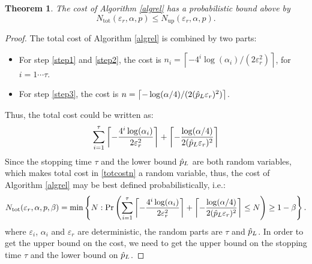 \documentclass{iitthesis}
\newtheorem{theorem}{Theorem}[section]
\theoremstyle{definition}
\begin{document}
\begin{theorem} \label{costupperboundrel}
The cost of Algorithm \ref{algrel} has a probabilistic bound above by $$N_{\text{tot}}(\varepsilon_r,\alpha,p) \leq N_{\text{up}}(\varepsilon_r,\alpha,p).$$
\end{theorem}
\begin{proof}
The total cost of Algorithm \ref{algrel} is combined by two parts:
\begin{itemize}
\item For step \ref{step1} and \ref{step2}, the cost is $n_i = \left \lceil -4^i \log\left ( \alpha_i \right)/(2\varepsilon_r^2) \right \rceil$, for $i = 1 \cdots \tau$.
\item For step \ref{step3}, the cost is $n= \left \lceil -\log (\alpha/4)/(2  (\hat{p}_L \varepsilon_{r})^2)\right \rceil $. 
\end{itemize}
Thus, the total cost could be written as: 
\begin{align}\label{totcostn}
\sum_{i=1}^{\tau} \left \lceil -\frac{4^i \log(\alpha_i)} {2\varepsilon_r^2 } \right\rceil+\left \lceil -\frac{\log (\alpha/4)}{2  (\hat{p}_L \varepsilon_{r})^2} \right \rceil
\end{align}
Since the stopping time $\tau$ and the lower bound $\hat{p}_L$ are both random variables, which makes total cost in \eqref{totcostn} a random variable, thus, the cost of Algorithm \ref{algrel} may be best defined probabilistically, i.e.:
$$N_{\text{tot}}(\varepsilon_r, \alpha,p,\beta)= \min\left \{N: \Pr\left (\sum_{i=1}^{\tau} \left \lceil -\frac{4^i \log(\alpha_i)} {2\varepsilon_r^2 } \right\rceil+\left \lceil -\frac{\log (\alpha/4)}{2  (\hat{p}_L \varepsilon_{r})^2} \right \rceil \leq N\right) \geq 1-\beta \right \}.$$
where $\varepsilon_i$, $\alpha_i$ and $\varepsilon_r$ are deterministic, the random parts are $\tau$ and $\hat{p}_{L}$. In order to get the upper bound on the cost, we need to get the upper bound on the stopping time $\tau$ and the lower bound on $\hat{p}_L$.


\end{proof}
\end{document}
